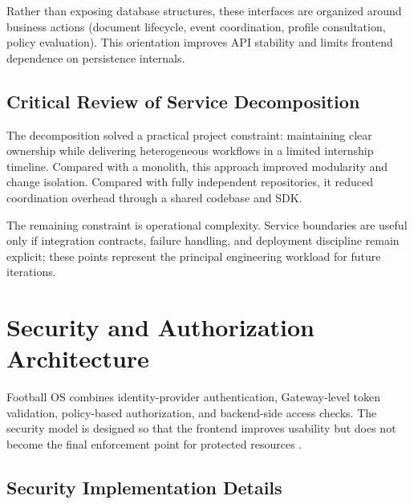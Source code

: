 Rather than exposing database structures, these interfaces are organized around
business actions (document lifecycle, event coordination, profile consultation,
policy evaluation). This orientation improves API stability and limits
frontend dependence on persistence internals.

\subsection{Critical Review of Service Decomposition}

The decomposition solved a practical project constraint: maintaining clear
ownership while delivering heterogeneous workflows in a limited internship
timeline. Compared with a monolith, this approach improved modularity and
change isolation. Compared with fully independent repositories, it reduced
coordination overhead through a shared codebase and SDK.

The remaining constraint is operational complexity. Service boundaries are
useful only if integration contracts, failure handling, and deployment
discipline remain explicit; these points represent the principal engineering
workload for future iterations.



\section{Security and Authorization Architecture}

Football OS combines identity-provider authentication, Gateway-level token
validation, policy-based authorization, and backend-side access checks. The
security model is designed so that the frontend improves usability but does not
become the final enforcement point for protected resources
\cite{keycloak-doc,oauth2-rfc6749,oidc-core,rbac-sandhu,opa-doc}.

\subsection{Security Implementation Details}

